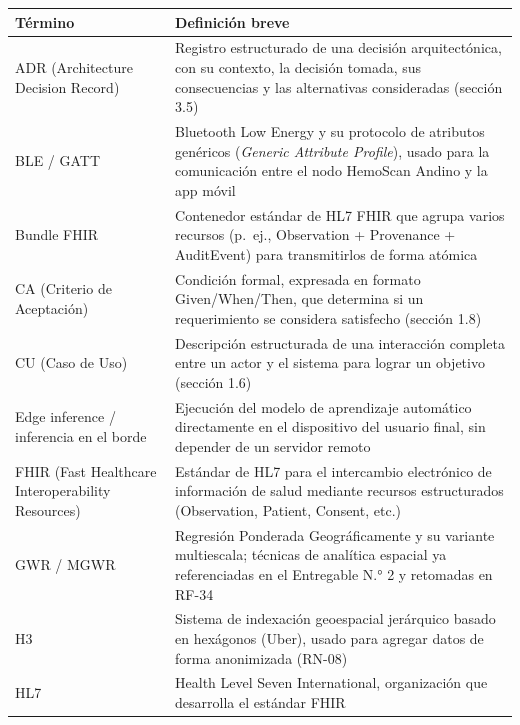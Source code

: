 \documentclass[11pt,a4paper]{article}
\begin{document}
{\small
\begin{longtable}[]{@{}
  >{\raggedright\arraybackslash}p{}
  >{\raggedright\arraybackslash}p{}@{}}
\toprule\noalign{}
\begin{minipage}[b]{\linewidth}\raggedright
Término
\end{minipage} & \begin{minipage}[b]{\linewidth}\raggedright
Definición breve
\end{minipage} \\
\midrule\noalign{}
\endhead
\bottomrule\noalign{}
\endlastfoot
ADR (Architecture Decision Record) & Registro estructurado de una decisión arquitectónica, con su contexto, la decisión tomada, sus consecuencias y las alternativas consideradas (sección 3.5) \\
BLE / GATT & Bluetooth Low Energy y su protocolo de atributos genéricos (\emph{Generic Attribute Profile}), usado para la comunicación entre el nodo HemoScan Andino y la app móvil \\
Bundle FHIR & Contenedor estándar de HL7 FHIR que agrupa varios recursos (p.~ej., Observation + Provenance + AuditEvent) para transmitirlos de forma atómica \\
CA (Criterio de Aceptación) & Condición formal, expresada en formato Given/When/Then, que determina si un requerimiento se considera satisfecho (sección 1.8) \\
CU (Caso de Uso) & Descripción estructurada de una interacción completa entre un actor y el sistema para lograr un objetivo (sección 1.6) \\
Edge inference / inferencia en el borde & Ejecución del modelo de aprendizaje automático directamente en el dispositivo del usuario final, sin depender de un servidor remoto \\
FHIR (Fast Healthcare Interoperability Resources) & Estándar de HL7 para el intercambio electrónico de información de salud mediante recursos estructurados (Observation, Patient, Consent, etc.) \\
GWR / MGWR & Regresión Ponderada Geográficamente y su variante multiescala; técnicas de analítica espacial ya referenciadas en el Entregable N.° 2 y retomadas en RF-34 \\
H3 & Sistema de indexación geoespacial jerárquico basado en hexágonos (Uber), usado para agregar datos de forma anonimizada (RN-08) \\
HL7 & Health Level Seven International, organización que desarrolla el estándar FHIR \\

\end{longtable}}
\end{document}
